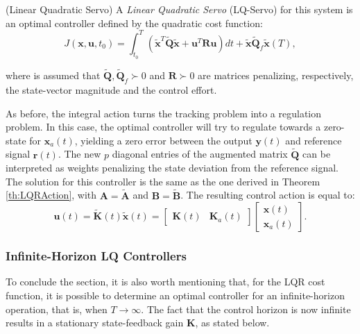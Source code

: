 \documentclass[a4paper,11pt]{book}
\numberwithin{figure}{chapter}
\numberwithin{equation}{chapter}
\numberwithin{table}{chapter}
\theoremstyle{definition}
\newtheorem{definition}{Definition}[chapter]
\newcounter{boxed-theorem}
\newcounter{boxed-lemma}
\newcounter{boxed-definition}
\newenvironment{boxed-definition}[1]
{\colorlet{shadecolor}{pastelYellow!15} \begin{shaded} \begin{definition}{#1}}
{\end{definition} \end{shaded}}
\newcounter{boxed-example}
\begin{document}
\begin{boxed-definition}{(Linear Quadratic Servo)}
    A \textit{Linear Quadratic Servo} (LQ-Servo) for this system is an optimal controller defined by the quadratic cost function:
    \begin{equation}
        J(\bm{x}, \bm{u}, t_0) = \int_{t_0}^{T} \left( \tilde{\bm{x}}^T \tilde{\bm{Q}} \tilde{\bm{x}} + \bm{u}^T \bm{R} \bm{u} \right) dt +\tilde{\bm{x}} \tilde{\bm{Q}}_f \tilde{\bm{x}}(T)
    ,\end{equation}
    
    \noindent where is assumed that $\tilde{\bm{Q}}, \tilde{\bm{Q}}_f \succ 0$ and $\bm{R} \succ 0$ are matrices penalizing, respectively, the state-vector magnitude and the control effort.
\end{boxed-definition}

As before, the integral action turns the tracking problem into a regulation problem. In this case, the optimal controller will try to regulate towards a zero-state for $\bm{x}_a(t)$, yielding a zero error between the output $\bm{y}(t)$ and reference signal $\bm{r}(t)$. The new $p$ diagonal entries of the augmented matrix $\tilde{\bm{Q}}$ can be interpreted as weights penalizing the state deviation from the reference signal. The solution for this controller is the same as the one derived in Theorem \ref{th:LQRAction}, with $\bm{A} = \tilde{\bm{A}}$ and $\bm{B} = \tilde{\bm{B}}$. The resulting control action is equal to:
\begin{equation}
    \bm{u}(t) = \tilde{\bm{K}}(t)\tilde{\bm{x}}(t) = \begin{bmatrix} \bm{K}(t) & \bm{K}_a(t) \end{bmatrix} \begin{bmatrix} \bm{x}(t) \\ \bm{x}_a(t) \end{bmatrix}
.\end{equation}

\subsubsection{Infinite-Horizon LQ Controllers}

To conclude the section, it is also worth mentioning that, for the LQR cost function, it is possible to determine an optimal controller for an infinite-horizon operation, that is, when $T \to \infty$. The fact that the control horizon is now infinite results in a stationary state-feedback gain $\bm{K}$, as stated below.
\end{document}
